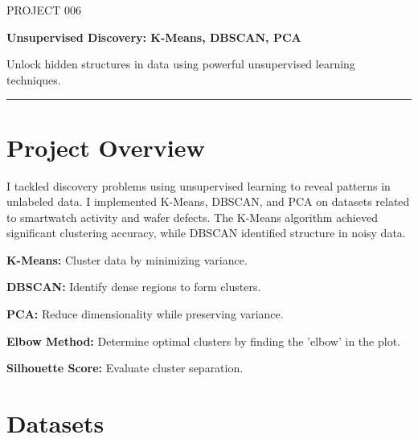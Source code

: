 \documentclass[11pt,a4paper]{article}
\begin{document}
\thispagestyle{empty}

{\colorbox{primary}{}}

\vspace{6pt}

{\fontsize{9}{11}\selectfont\color{codemuted}PROJECT 006}

\vspace{1pt}
{\fontsize{22}{27}\selectfont\bfseries\color{titleblue} Unsupervised Discovery: K-Means, DBSCAN, PCA}

\vspace{2pt}
{\normalsize\color{accent} Unlock hidden structures in data using powerful unsupervised learning techniques.}

\vspace{4pt}
{\color{tableheader}\rule{\linewidth}{0.4pt}}

\vspace{3pt}

\section{Project Overview}

I tackled discovery problems using unsupervised learning to reveal patterns in unlabeled data. I implemented K-Means, DBSCAN, and PCA on datasets related to smartwatch activity and wafer defects. The K-Means algorithm achieved significant clustering accuracy, while DBSCAN identified structure in noisy data.

\textbf{K-Means:} Cluster data by minimizing variance.

\textbf{DBSCAN:} Identify dense regions to form clusters.

\textbf{PCA:} Reduce dimensionality while preserving variance.

\textbf{Elbow Method:} Determine optimal clusters by finding the 'elbow' in the plot.

\textbf{Silhouette Score:} Evaluate cluster separation.


\section{Datasets}
\end{document}
